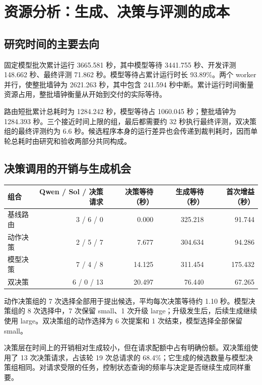 \section{资源分析：生成、决策与评测的成本}\label{sec:resources}
\subsection{研究时间的主要去向}
固定模型批次累计运行 3665.581 秒，其中模型等待 3441.755 秒、开发评测 148.662 秒、最终评测 71.862 秒。模型等待占累计运行时长 93.89\%。两个 worker 并行，使整批墙钟为 2621.263 秒，其中包含 241.594 秒中断。累计运行时间衡量资源占用，整批墙钟衡量从开始到交付的实际等待。


路由短批累计总耗时为 1284.242 秒，模型等待占 1060.045 秒；整批墙钟为 1284.393 秒。三个接近时间上限的组，最后都需要约 32 秒执行最终评测，双决策组的最终评测约为 6.6 秒。候选程序本身的运行差异也会传递到裁判耗时，因而单轮总耗时由研究和验收两部分共同构成。

\subsection{决策调用的开销与生成机会}
\begin{smalltable}
\begin{tabularx}{\linewidth}{@{}Lrrrr@{}}\toprule
组合 & Qwen / Sol / 决策请求 & 决策等待（秒） & 生成等待（秒） & 首次增益（秒）\\\midrule
基线路由 & 3 / 6 / 0 & 0.000 & 325.218 & 91.744\\
动作决策 & 2 / 5 / 7 & 7.677 & 304.634 & 94.286\\
模型决策 & 7 / 4 / 8 & 14.125 & 311.454 & 175.432\\
双决策 & 6 / 0 / 13 & 20.497 & 76.440 & 67.265\\\bottomrule
\end{tabularx}
\end{smalltable}

动作决策组的 7 次选择全部用于提出候选，平均每次决策等待约 1.10 秒。模型决策组的 8 次选择中，7 次保留 small、1 次升级 large；升级发生后，后续生成继续使用 large。双决策组的动作选择为 6 次提案和 1 次结束，模型选择全部保留 small。

决策层在时间上的开销相对生成较小，但在请求配额中占有明确份额。双决策组使用了 13 次决策请求，占该轮 19 次总请求的 68.4\%；它生成的候选数量与模型决策组相同。对请求受限的任务，控制状态查询的频率与决定是否继续生成同样重要。

